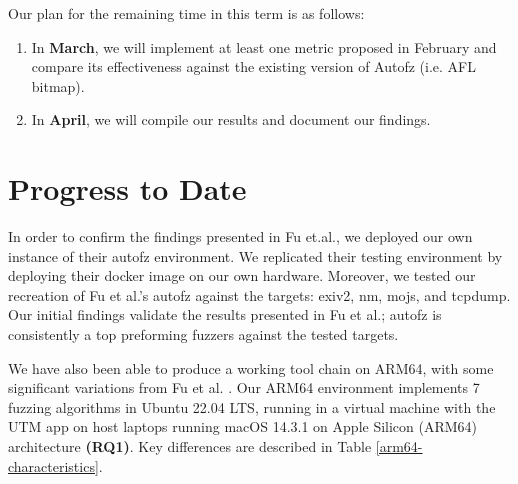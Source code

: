 Our plan for the remaining time in this term is as follows:

\begin{enumerate}
    \item In \textbf{March}, we will implement at least one metric proposed in February
     and compare its effectiveness against the existing version of Autofz (i.e. AFL bitmap).

    \item In \textbf{April}, we will compile our results and document our findings.
\end{enumerate}

\section{Progress to Date}
In order to confirm the findings presented in Fu et.al.\cite{Fu}, we deployed our own instance of
their autofz environment. We replicated their testing environment by deploying their docker image
on our own hardware. Moreover, we tested our recreation of Fu et al.'s autofz against the targets:
exiv2, nm, mojs, and tcpdump. Our initial findings validate the results presented in Fu et al.;
autofz is consistently a top preforming fuzzers against the tested targets.

We have also been able to produce a working tool chain on ARM64, with some significant variations
from Fu et al. \cite{Fu}. Our ARM64 environment implements 7 fuzzing algorithms in
Ubuntu 22.04 LTS, running in a virtual machine with the UTM app on host laptops running
macOS 14.3.1 on Apple Silicon (ARM64) architecture \textbf{(RQ1)}. Key differences are
described in Table \ref{arm64-characteristics}.

